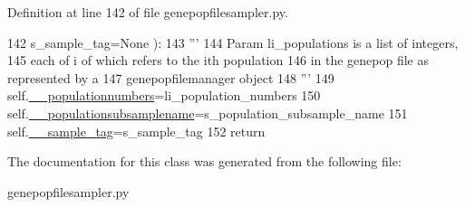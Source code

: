 Definition at line 142 of file genepopfilesampler.\+py.


\begin{DoxyCode}
142                 s\_sample\_tag=\textcolor{keywordtype}{None} ):
143         \textcolor{stringliteral}{'''}
144 \textcolor{stringliteral}{        Param li\_populations is a list of integers,}
145 \textcolor{stringliteral}{        each of i of which refers to the ith population}
146 \textcolor{stringliteral}{        in the genepop file as represented by a }
147 \textcolor{stringliteral}{        genepopfilemanager object}
148 \textcolor{stringliteral}{        '''}
149         self.\hyperlink{classnegui_1_1genepopfilesampler_1_1GenepopFileSampleParams_a48dfd2df4eb75dbacdc8a274cd3323ad}{\_\_populationnumbers}=li\_population\_numbers
150         self.\hyperlink{classnegui_1_1genepopfilesampler_1_1GenepopFileSampleParams_ae03531d2c9d450d7f717816a06f3a08a}{\_\_populationsubsamplename}=s\_population\_subsample\_name
151         self.\hyperlink{classnegui_1_1genepopfilesampler_1_1GenepopFileSampleParams_a8241527923481f69d4e6c4f17de30262}{\_\_sample\_tag}=s\_sample\_tag
152         \textcolor{keywordflow}{return}
\end{DoxyCode}


The documentation for this class was generated from the following file\+:\begin{DoxyCompactItemize}
\item 
genepopfilesampler.\+py\end{DoxyCompactItemize}
